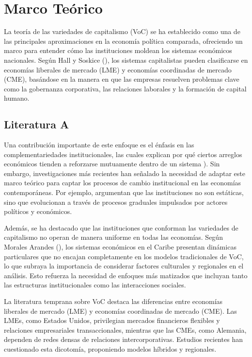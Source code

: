 \documentclass[12pt]{article}
\begin{document}
\blindtext[2]

\section{Marco Teórico}
La teoría de las variedades de capitalismo (VoC) se ha establecido como una de las principales aproximaciones en la economía política comparada, ofreciendo un marco para entender cómo las instituciones moldean los sistemas económicos nacionales. Según Hall y Soskice (\citeyear{hall2001introduction}), los sistemas capitalistas pueden clasificarse en economías liberales de mercado (LME) y economías coordinadas de mercado (CME), basándose en la manera en que las empresas resuelven problemas clave como la gobernanza corporativa, las relaciones laborales y la formación de capital humano. 

\blindtext[2]

\subsection{Literatura A}

Una contribución importante de este enfoque es el énfasis en las complementariedades institucionales, las cuales explican por qué ciertos arreglos económicos tienden a reforzarse mutuamente dentro de un sistema \citep{hall2001introduction}). Sin embargo, investigaciones más recientes han señalado la necesidad de adaptar este marco teórico para captar los procesos de cambio institucional en las economías contemporáneas. Por ejemplo, \citet{hall2009institutional} argumentan que las instituciones no son estáticas, sino que evolucionan a través de procesos graduales impulsados por actores políticos y económicos.

Además, se ha destacado que las instituciones que conforman las variedades de capitalismo no operan de manera uniforme en todas las economías. Según Morales Arandes (\citeyear{morales2002}), los sistemas económicos en el Caribe presentan dinámicas particulares que no encajan completamente en los modelos tradicionales de VoC, lo que subraya la importancia de considerar factores culturales y regionales en el análisis. Esto refuerza la necesidad de enfoques más matizados que incluyan tanto las estructuras institucionales como las interacciones sociales.

\blindtext

La literatura temprana sobre VoC destaca las diferencias entre economías liberales de mercado (LME) y economías coordinadas de mercado (CME). Las LMEs, como Estados Unidos, privilegian mercados financieros flexibles y relaciones empresariales transaccionales, mientras que las CMEs, como Alemania, dependen de redes densas de relaciones intercorporativas. Estudios recientes han cuestionado esta dicotomía, proponiendo modelos híbridos y regionales.
\end{document}
